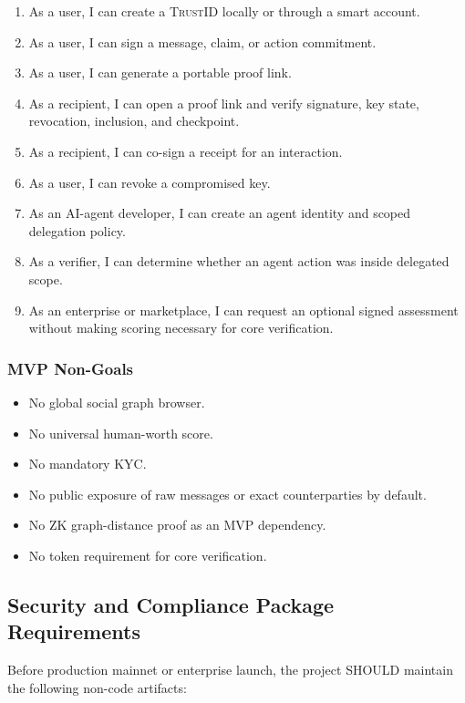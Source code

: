 \documentclass[11pt]{article}
\newcommand{\TrustID}{\textsc{TrustID}}
\begin{document}
\begin{enumerate}
    \item As a user, I can create a \TrustID{} locally or through a smart account.
    \item As a user, I can sign a message, claim, or action commitment.
    \item As a user, I can generate a portable proof link.
    \item As a recipient, I can open a proof link and verify signature, key state, revocation, inclusion, and checkpoint.
    \item As a recipient, I can co-sign a receipt for an interaction.
    \item As a user, I can revoke a compromised key.
    \item As an AI-agent developer, I can create an agent identity and scoped delegation policy.
    \item As a verifier, I can determine whether an agent action was inside delegated scope.
    \item As an enterprise or marketplace, I can request an optional signed assessment without making scoring necessary for core verification.
\end{enumerate}

\subsubsection{MVP Non-Goals}

\begin{itemize}
    \item No global social graph browser.
    \item No universal human-worth score.
    \item No mandatory KYC.
    \item No public exposure of raw messages or exact counterparties by default.
    \item No ZK graph-distance proof as an MVP dependency.
    \item No token requirement for core verification.
\end{itemize}

\subsection{Security and Compliance Package Requirements}

Before production mainnet or enterprise launch, the project SHOULD maintain the following non-code artifacts:
\end{document}
